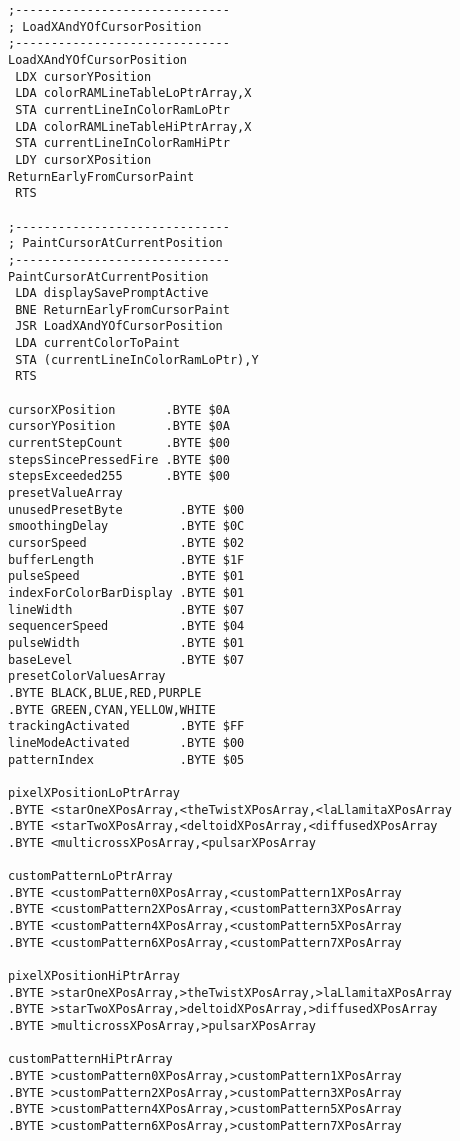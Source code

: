 \hspace{-0.1cm}
\begin{minipage}[b]{0.33\linewidth}
\begin{lrbox}{\mybox}%
\begin{lstlisting}[basicstyle=\ttfamily\tiny]
;------------------------------
; LoadXAndYOfCursorPosition
;------------------------------
LoadXAndYOfCursorPosition
 LDX cursorYPosition
 LDA colorRAMLineTableLoPtrArray,X
 STA currentLineInColorRamLoPtr
 LDA colorRAMLineTableHiPtrArray,X
 STA currentLineInColorRamHiPtr
 LDY cursorXPosition
ReturnEarlyFromCursorPaint
 RTS

;------------------------------
; PaintCursorAtCurrentPosition
;------------------------------
PaintCursorAtCurrentPosition
 LDA displaySavePromptActive
 BNE ReturnEarlyFromCursorPaint
 JSR LoadXAndYOfCursorPosition
 LDA currentColorToPaint
 STA (currentLineInColorRamLoPtr),Y
 RTS

cursorXPosition       .BYTE $0A
cursorYPosition       .BYTE $0A
currentStepCount      .BYTE $00
stepsSincePressedFire .BYTE $00
stepsExceeded255      .BYTE $00
presetValueArray
unusedPresetByte        .BYTE $00
smoothingDelay          .BYTE $0C
cursorSpeed             .BYTE $02
bufferLength            .BYTE $1F
pulseSpeed              .BYTE $01
indexForColorBarDisplay .BYTE $01
lineWidth               .BYTE $07
sequencerSpeed          .BYTE $04
pulseWidth              .BYTE $01
baseLevel               .BYTE $07
presetColorValuesArray
.BYTE BLACK,BLUE,RED,PURPLE
.BYTE GREEN,CYAN,YELLOW,WHITE
trackingActivated       .BYTE $FF
lineModeActivated       .BYTE $00
patternIndex            .BYTE $05

pixelXPositionLoPtrArray
.BYTE <starOneXPosArray,<theTwistXPosArray,<laLlamitaXPosArray
.BYTE <starTwoXPosArray,<deltoidXPosArray,<diffusedXPosArray
.BYTE <multicrossXPosArray,<pulsarXPosArray

customPatternLoPtrArray
.BYTE <customPattern0XPosArray,<customPattern1XPosArray
.BYTE <customPattern2XPosArray,<customPattern3XPosArray
.BYTE <customPattern4XPosArray,<customPattern5XPosArray
.BYTE <customPattern6XPosArray,<customPattern7XPosArray

pixelXPositionHiPtrArray
.BYTE >starOneXPosArray,>theTwistXPosArray,>laLlamitaXPosArray
.BYTE >starTwoXPosArray,>deltoidXPosArray,>diffusedXPosArray
.BYTE >multicrossXPosArray,>pulsarXPosArray

customPatternHiPtrArray
.BYTE >customPattern0XPosArray,>customPattern1XPosArray
.BYTE >customPattern2XPosArray,>customPattern3XPosArray
.BYTE >customPattern4XPosArray,>customPattern5XPosArray
.BYTE >customPattern6XPosArray,>customPattern7XPosArray


\end{lstlisting}
\end{lrbox}
\end{minipage}
